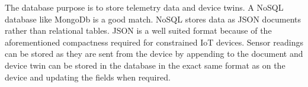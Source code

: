 The database purpose is to store telemetry data and device twins. A NoSQL database like MongoDb \cite{mongo} is a good match. NoSQL stores data as JSON documents rather than relational tables. JSON is a well suited format because of the aforementioned compactness required for constrained IoT devices. Sensor readings can be stored as they are sent from the device by appending to the document and device twin can be stored in the database in the exact same format as on the device and updating the fields when required. 